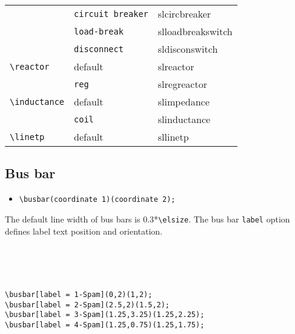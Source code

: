 \documentclass[a4]{article}
\begin{document}
\begin{table}[h]
\begin{tabular}{lll}
                                & \verb+circuit breaker+        & slcircbreaker \\
                                & \verb+load-break+     & slloadbreakswitch     \\
                                & \verb+disconnect+     & sldisconswitch        \\
\verb+\reactor+         & default       & slreactor     \\
                                & \verb+reg+                    & slregreactor \\
\verb+\inductance+      & default       & slimpedance   \\
                                & \verb+coil+           & slinductance  \\
\verb+\linetp+  & default       & sllinetp      \\ 
\bottomrule
\bottomrule
\end{tabular}
\end{table}
\pagebreak
\subsection{Bus bar}
\begin{itemize}
\item[]\color{myblue}\verb+\busbar(coordinate 1)(coordinate 2);+ 
\end{itemize}
The default line width of bus bars is 0.3*\verb+\elsize+. The bus bar \verb+label+ option defines label text position and orientation. 
\begin{examplebox}
\\ \ \\ \ \\
\begin{minipage}{0.4\textwidth}
\end{minipage}
\begin{minipage}{0.45\textwidth}
\begin{verbatim}
\busbar[label = 1-Spam](0,2)(1,2);
\busbar[label = 2-Spam](2.5,2)(1.5,2);
\busbar[label = 3-Spam](1.25,3.25)(1.25,2.25);
\busbar[label = 4-Spam](1.25,0.75)(1.25,1.75);
\end{verbatim}
\end{minipage}
\end{examplebox}
\newpage
\end{document}
